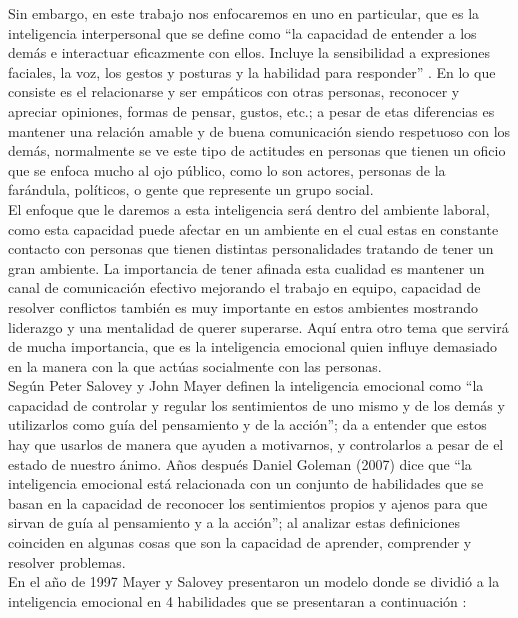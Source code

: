 Sin embargo, en este trabajo nos enfocaremos en uno en particular, que es la
inteligencia interpersonal que se define como “la capacidad de entender a los
demás e interactuar eficazmente con ellos. Incluye la sensibilidad a expresiones
faciales, la voz, los gestos y posturas y la habilidad para responder”
\parencite{macias2016}. En lo que consiste es el relacionarse y ser
empáticos con otras personas, reconocer y apreciar opiniones, formas de pensar,
gustos, etc.; a pesar de etas diferencias es mantener una relación amable y de
buena comunicación siendo respetuoso con los demás, normalmente se ve este tipo
de actitudes en personas que tienen un oficio que se enfoca mucho al ojo
público, como lo son actores, personas de la farándula, políticos, o gente que
represente un grupo social.\\
El enfoque que le daremos a esta inteligencia será dentro del ambiente laboral,
como esta capacidad puede afectar en un ambiente en el cual estas en constante
contacto con personas que tienen distintas personalidades tratando de tener un
gran ambiente. La importancia de tener afinada esta cualidad es mantener un
canal de comunicación efectivo mejorando el trabajo en equipo, capacidad de
resolver conflictos también es muy importante en estos ambientes mostrando
liderazgo y una mentalidad de querer superarse. Aquí entra otro tema que servirá
de mucha importancia, que es la inteligencia emocional quien influye demasiado
en la manera con la que actúas socialmente con las personas.\\
Según Peter Salovey y John Mayer definen la inteligencia emocional como
“la capacidad de controlar y regular los sentimientos de uno mismo y de los
demás y utilizarlos como guía del pensamiento y de la acción”; da a entender que
estos hay que usarlos de manera que ayuden a motivarnos, y controlarlos a pesar
de el estado de nuestro ánimo. Años después Daniel Goleman (2007) dice que “la
inteligencia emocional está relacionada con un conjunto de habilidades que se
basan en la capacidad de reconocer los sentimientos propios y ajenos para que
sirvan de guía al pensamiento y a la acción”; al analizar estas definiciones
coinciden en algunas cosas que son la capacidad de aprender, comprender y
resolver problemas.\\
En el año de 1997 Mayer y Salovey presentaron un modelo donde se dividió a la
inteligencia emocional en 4 habilidades que se presentaran a continuación
\parencite{ayuso2016}:
